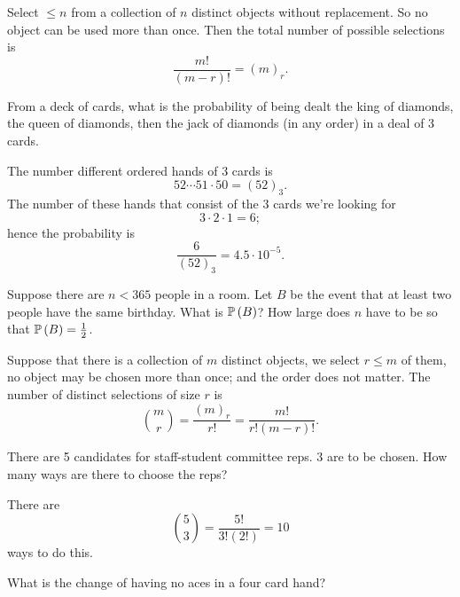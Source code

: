 \begin{proposition}
    Select $ \leq n$ from a collection of $n$ distinct objects without replacement. So no object can be used more than once. Then the total number of possible selections is \[ \frac{m!}{(m - r)!} = (m)_r. \]
\end{proposition}

\begin{example}
    From a deck of cards, what is the probability of being dealt the king of diamonds, the queen of diamonds, then the jack of diamonds (in any order) in a deal of 3 cards.
\end{example}

\begin{solution}
    The number different ordered hands of $3$ cards is \[ 52 \cdots 51 \cdot 50 = (52)_3. \] The number of these hands that consist of the 3 cards we're looking for \[ 3 \cdot 2 \cdot 1 = 6; \] hence the probability is \[ \frac{6}{(52)_3} = 4.5 \cdot 10^{-5}. \]
\end{solution}

\begin{example}
    Suppose there are $n < 365$ people in a room. Let $B$ be the event that at least two people have the same birthday. What is $\operatorname{\mathbb{P}}{(B)}$? How large does $n$ have to be so that $\operatorname{\mathbb{P}}{(B)} = \frac{1}{2}$.
\end{example}

\begin{proposition}
    Suppose that there is a collection of $m$ distinct objects, we select $r \leq m$ of them, no object may be chosen more than once; and the order does not matter. The number of distinct selections of size $r$ is \[ \binom{m}{r} = \frac{(m)_r}{r!} = \frac{m!}{r!(m - r)!}. \]
\end{proposition}

\begin{example}
    There are 5 candidates for staff-student committee reps. 3 are to be chosen. How many ways are there to choose the reps?
\end{example}

\begin{solution}
    There are \[ \binom{5}{3} = \frac{5!}{3!(2!)} = 10 \] ways to do this.
\end{solution}

\begin{example}
    What is the change of having no aces in a four card hand?
\end{example}

